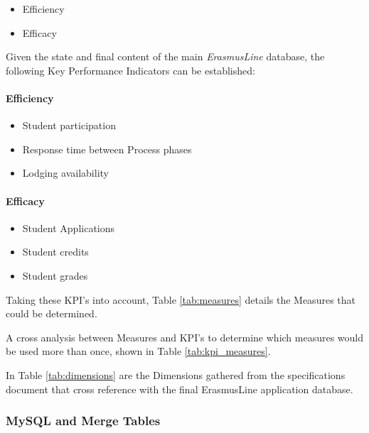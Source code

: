\begin{itemize}
  \item Efficiency
  \item Efficacy
\end{itemize}

Given the state and final content of the main \emph{ErasmusLine} database, the
following Key Performance Indicators can be established:

\paragraph{Efficiency}
\begin{itemize}
  \item Student participation
  \item Response time between Process phases
  \item Lodging availability
\end{itemize}

\paragraph{Efficacy}
\begin{itemize}
  \item Student Applications
  \item Student credits
  \item Student grades
\end{itemize}

Taking these KPI's into account, Table \ref{tab:measures} details the
Measures that could be determined.


A cross analysis between Measures and KPI's to determine which measures would
be used more than once, shown in Table \ref{tab:kpi_measures}.


In Table \ref{tab:dimensions} are the Dimensions gathered from the
specifications document that cross reference with the final ErasmusLine
application database.




\subsubsection{MySQL and Merge Tables}\label{ssec:mysql_merge}


